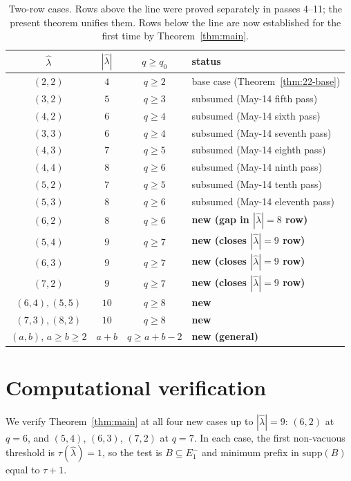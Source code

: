\documentclass[11pt]{article}
\theoremstyle{definition}
\newcommand{\hatl}{\widehat\lambda}
\newcommand{\supp}{\mathrm{supp}}
\begin{document}
\begin{table}[h]
\centering
\renewcommand{\arraystretch}{1.15}
\caption{Two-row cases.  Rows above the line were proved separately
in passes 4--11; the present theorem unifies them.  Rows below the
line are now established for the first time by
Theorem~\ref{thm:main}.}
\begin{tabular}{c|c|c|l}
\toprule
$\hatl$ & $|\hatl|$ & $q \ge q_0$ & status \\
\midrule
$(2, 2)$ & $4$ & $q \ge 2$ & base case (Theorem~\ref{thm:22-base}) \\
$(3, 2)$ & $5$ & $q \ge 3$ & subsumed (May-14 fifth pass) \\
$(4, 2)$ & $6$ & $q \ge 4$ & subsumed (May-14 sixth pass) \\
$(3, 3)$ & $6$ & $q \ge 4$ & subsumed (May-14 seventh pass) \\
$(4, 3)$ & $7$ & $q \ge 5$ & subsumed (May-14 eighth pass) \\
$(4, 4)$ & $8$ & $q \ge 6$ & subsumed (May-14 ninth pass) \\
$(5, 2)$ & $7$ & $q \ge 5$ & subsumed (May-14 tenth pass) \\
$(5, 3)$ & $8$ & $q \ge 6$ & subsumed (May-14 eleventh pass) \\
\midrule
$(6, 2)$ & $8$ & $q \ge 6$ & \textbf{new (gap in $|\hatl|=8$ row)} \\
$(5, 4)$ & $9$ & $q \ge 7$ & \textbf{new (closes $|\hatl|=9$ row)} \\
$(6, 3)$ & $9$ & $q \ge 7$ & \textbf{new (closes $|\hatl|=9$ row)} \\
$(7, 2)$ & $9$ & $q \ge 7$ & \textbf{new (closes $|\hatl|=9$ row)} \\
$(6, 4), (5, 5)$ & $10$ & $q \ge 8$ & \textbf{new} \\
$(7, 3), (8, 2)$ & $10$ & $q \ge 8$ & \textbf{new} \\
$(a, b)$, $a \ge b \ge 2$ & $a + b$ & $q \ge a + b - 2$ & \textbf{new (general)} \\
\bottomrule
\end{tabular}
\end{table}

\section{Computational verification}\label{sec:verify}

We verify Theorem~\ref{thm:main} at all four new cases up to
$|\hatl| = 9$: $(6, 2)$ at $q = 6$, and $(5, 4)$, $(6, 3)$, $(7, 2)$
at $q = 7$.  In each case, the first non-vacuous threshold is
$\tau(\hatl) = 1$, so the test is $B \subseteq E_1^-$ and minimum
prefix in $\supp(B)$ equal to $\tau + 1$.
\end{document}
